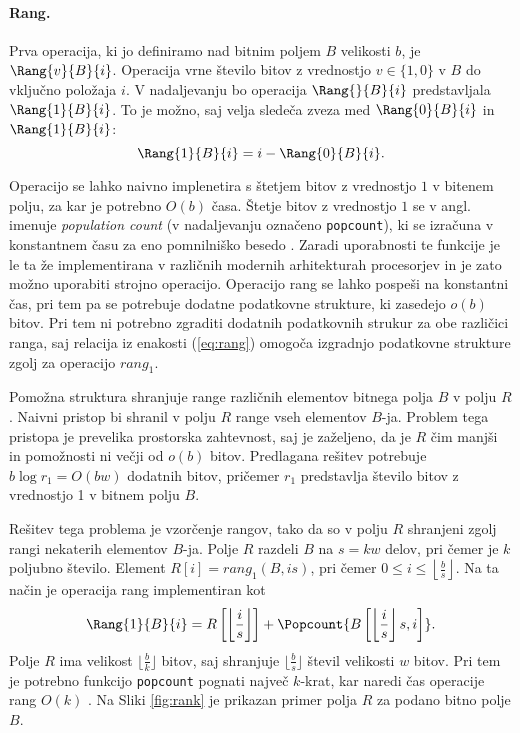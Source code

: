 \paragraph{Rang.} 
Prva operacija, ki jo definiramo nad bitnim poljem $B$ velikosti $b$, je $\Rang{v}{B}{i}$. Operacija vrne število bitov z vrednostjo $v\in\{1,0\}$ v $B$ do vključno položaja $i$. V nadaljevanju bo operacija $\Rang{}{B}{i}$ predstavljala $\Rang{1}{B}{i}$. To je možno, saj velja sledeča zveza med $\Rang{0}{B}{i}$ in $\Rang{1}{B}{i}$:
\begin{equation}\label{eq:rang}
    \Rang{1}{B}{i}=i-\Rang{0}{B}{i}.
\end{equation}

Operacijo se lahko naivno implenetira s štetjem bitov z vrednostjo $1$ v bitenem polju, za kar je potrebno $O(b)$ časa. Štetje bitov z vrednostjo $1$ se v angl. imenuje \textit{population count} (v nadaljevanju označeno \texttt{popcount}), ki se izračuna v konstantnem času za eno pomnilniško besedo \cite{Brodnik1995,Knuth2011}. Zaradi uporabnosti te funkcije je le ta že implementirana v različnih modernih arhitekturah procesorjev in je zato možno uporabiti strojno operacijo. Operacijo rang se lahko pospeši na konstantni čas, pri tem pa se potrebuje dodatne podatkovne strukture, ki zasedejo $o(b)$ bitov. Pri tem ni potrebno zgraditi dodatnih podatkovnih strukur za obe različici ranga, saj relacija iz enakosti (\ref{eq:rang}) omogoča izgradnjo podatkovne strukture zgolj za operacijo $rang_1$.

Pomožna struktura shranjuje range različnih elementov bitnega polja $B$ v polju $R$. Naivni pristop bi shranil v polju $R$ range vseh elementov $B$-ja. Problem tega pristopa je prevelika prostorska zahtevnost, saj je zaželjeno, da je $R$ čim manjši in pomožnosti ni večji od $o(b)$ bitov. Predlagana rešitev potrebuje $b\log{r_1}=O(bw)$ dodatnih bitov, pričemer $r_1$ predstavlja število bitov z vrednostjo 1 v bitnem polju $B$.

Rešitev tega problema je vzorčenje rangov, tako da so v polju $R$ shranjeni zgolj rangi nekaterih elementov $B$-ja. Polje $R$ razdeli $B$ na $s=kw$ delov, pri čemer je $k$ poljubno število. Element $R[i]=rang_1(B,is)$, pri čemer $0\le i \le \left\lfloor\frac{b}{s} \right\rfloor$. Na ta način je operacija rang implementiran kot 
\begin{equation*}
    \Rang{1}{B}{i}=R\left[\left\lfloor\frac{i}{s} \right\rfloor\right] + \Popcount{B\left[\left\lfloor\frac{i}{s} \right\rfloor s,i\right]}.
\end{equation*}
Polje $R$ ima velikost $\lfloor\frac{b}{k}\rfloor$ bitov, saj shranjuje $\lfloor\frac{b}{s}\rfloor$ števil velikosti $w$ bitov. Pri tem je potrebno funkcijo \texttt{popcount} pognati največ $k$-krat, kar naredi čas operacije rang $O(k)$ \cite{Navarro2016}. Na Sliki \ref{fig:rank} je prikazan primer polja $R$ za podano bitno polje $B$.

